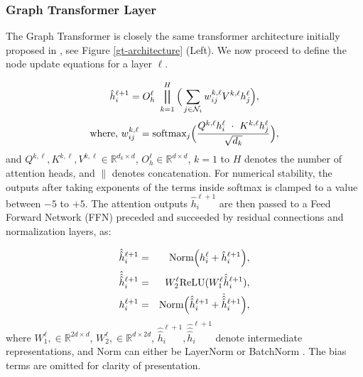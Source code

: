 \documentclass[letterpaper]{article} %
\begin{document}
\subsubsection{Graph Transformer Layer} The Graph Transformer is closely the same transformer architecture initially proposed in \cite{vaswani2017attention}, see Figure \ref{gt-architecture} (Left).
We now proceed to define the node update equations for a layer $\ell$.

\begin{equation}
    \label{eqn:gt_layer}
    \hat{h}_{i}^{\ell+1} = O_h^{\ell} \ \bigparallel_{k=1}^{H} \Big(\sum_{j \in \mathcal{N}_i} w_{ij}^{k,\ell} V^{k,\ell}h_j^{\ell} \Big),
\end{equation}
\begin{equation}
    \label{eqn:softmax}
    \textnormal{where,} \ w_{ij}^{k,\ell} = \textnormal{softmax}_j \Big(\frac{Q^{k, \ell} h_i^{\ell} \ \cdot \ K^{k, \ell}h_j^{\ell}}{\sqrt{d_k}}  \Big),
\end{equation}
and $Q^{k,\ell}, K^{k,\ell}, V^{k,\ell} \in \mathbb{R}^{d_k \times d}$, $O_h^{\ell} \in \mathbb{R}^{d \times d}$, $k=1$ to $H$ denotes the number of attention heads, and $\|$ denotes concatenation.
For numerical stability, the outputs after taking exponents of the terms inside softmax is clamped to a value between $-5$ to $+5$.
The attention outputs $\hat{h}_{i}^{\ell+1}$ are then passed to a Feed Forward Network (FFN) preceded and succeeded by residual connections and normalization layers, as:

\begin{eqnarray}
    \hat{\hat{h}}_{i}^{\ell+1} &=& \textnormal{Norm} \Big( h_{i}^{\ell} + \hat{h}_{i}^{\ell+1} \Big), \label{eqn:rc_norm1}\\
    \hat{\hat{\hat{h}}}_{i}^{\ell+1} &=& W_2^{\ell} \textnormal{ReLU}(W_1^{\ell} \hat{\hat{h}}_{i}^{\ell+1}), \label{eqn:ffn}\\
    h_{i}^{\ell+1} &=& \textnormal{Norm} \Big( \hat{\hat{h}}_{i}^{\ell+1} + \hat{\hat{\hat{h}}}_{i}^{\ell+1} \Big), \label{eqn:rc_norm2}
\end{eqnarray}
where $W_1^{\ell}, \in \mathbb{R}^{2d \times d}$, $W_2^{\ell}, \in \mathbb{R}^{d \times 2d}$, $\hat{\hat{h}}_{i}^{\ell+1}, \hat{\hat{\hat{h}}}_{i}^{\ell+1}$ denote intermediate representations, and  Norm can either be LayerNorm\cite{ba2016layer} or BatchNorm \cite{ioffe2015batch}. The bias terms are omitted for clarity of presentation.
\end{document}
